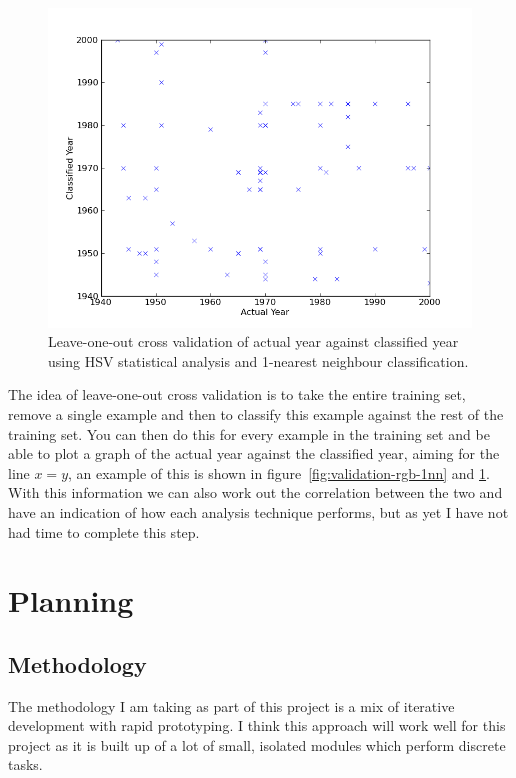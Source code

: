\documentclass[11pt,fleqn,twoside]{article}
\begin{document}
\begin{figure}[h]
\centering
\includegraphics[scale=0.5]{img/validation-hsv-1nn.png}
\caption{Leave-one-out cross validation of actual year against classified year using HSV statistical analysis and
1-nearest neighbour classification.}
\label{fig:validation-hsv-1nn}
\end{figure}

The idea of leave-one-out cross validation is to take the entire training set, remove a single 
example and then to classify this example against the rest of the training set. You can then do
this for every example in the training set and be able to plot a graph of the actual year against
the classified year, aiming for the line $x=y$, an example of this is shown in 
figure~\ref{fig:validation-rgb-1nn} and \ref{fig:validation-hsv-1nn}. With this information we can also work out the correlation 
between the two and have an indication of how each analysis technique performs, but as yet I have
not had time to complete this step.


\clearpage
\section{Planning}

\subsection{Methodology}
The methodology I am taking as part of this project is a mix of iterative development with rapid
prototyping. I think this approach will work well for this project as it is built up of a lot of 
small, isolated modules which perform discrete tasks.
\end{document}
